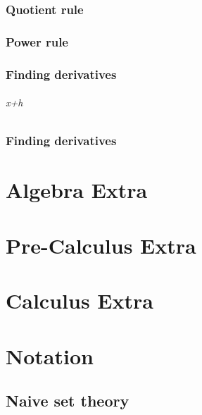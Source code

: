 \documentclass[12pt, a4paper,oneside]{book}
\begin{document}
\section{Quotient rule}




\section{Power rule}


\section{Finding derivatives}
\paragraph{x+h}

\section{Finding derivatives}


\part {Algebra Extra}

\part {Pre-Calculus Extra}

\part{Calculus Extra}

\appendix 
\part{Notation}
\chapter{Naive set theory}
\end{document}
